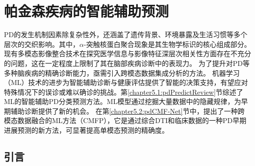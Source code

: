 \chapter{帕金森疾病的智能辅助预测} 
\label{chapter:pdPrediction}


PD的发生机制因素除复杂性外，还涵盖了遗传背景、环境暴露及生活习惯等多个层次的交织影响。其中，$\alpha$-突触核蛋白聚合现象是其生物学标识的核心组成部分。现有多模态影像整合技术在探究医学信息与影像特征深层次相关性方面存在不充分的问题，这在一定程度上限制了其在脑部疾病诊断中的表现力。
为了提升对PD等多种脑疾病的精确诊断能力，亟需引入跨模态数据集成分析的方法。
机器学习（ML）技术的进步为智能辅助诊断与健康评估提供了智能的决策支持，有望应对特殊情况下的误诊或难以确诊的挑战。第\ref{chapter5.1:pdPredictReview}节综述了ML的智能辅助PD分类预测方法\cite{jyWen}。ML模型通过挖掘大量数据中的隐藏规律，为早期辅助诊断提供了新的机会。
在第\ref{chapter5.2:pdCMF-Net}节中，提出了一种跨模态数据融合的ML方法（CMFP），它是通过综合DTI和临床数据的一种PD早期进展预测的新方法，可显著提高单模态预测的精确度。

\section{引言}

